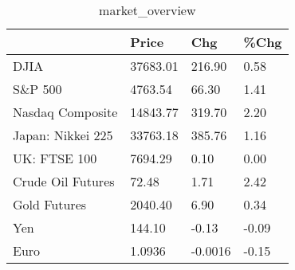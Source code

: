 \documentclass{article}%
\begin{document}
%


\begin{table}[htbp]%
\caption{market\_overview}%
\centering%
\begin{adjustbox}{width=1\textwidth}%
\begin{tabular}{llll}
\toprule
                  &    Price &     Chg &  \%Chg \\
\midrule
             DJIA & 37683.01 &  216.90 &  0.58 \\
          S\&P 500 &  4763.54 &   66.30 &  1.41 \\
 Nasdaq Composite & 14843.77 &  319.70 &  2.20 \\
Japan: Nikkei 225 & 33763.18 &  385.76 &  1.16 \\
     UK: FTSE 100 &  7694.29 &    0.10 &  0.00 \\
Crude Oil Futures &    72.48 &    1.71 &  2.42 \\
     Gold Futures &  2040.40 &    6.90 &  0.34 \\
              Yen &   144.10 &   -0.13 & -0.09 \\
             Euro &   1.0936 & -0.0016 & -0.15 \\
\bottomrule
\end{tabular}
%
\end{adjustbox}%
\end{table}

%
\end{document}
